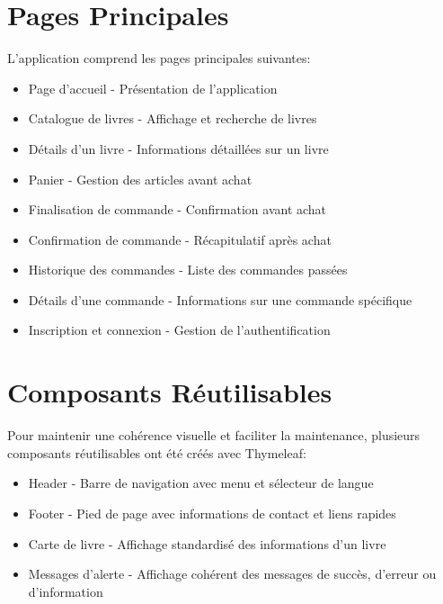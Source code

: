\documentclass[12pt,a4paper]{report}
\begin{document}
\section{Pages Principales}
L'application comprend les pages principales suivantes:

\begin{itemize}
    \item Page d'accueil - Présentation de l'application
    \item Catalogue de livres - Affichage et recherche de livres
    \item Détails d'un livre - Informations détaillées sur un livre
    \item Panier - Gestion des articles avant achat
    \item Finalisation de commande - Confirmation avant achat
    \item Confirmation de commande - Récapitulatif après achat
    \item Historique des commandes - Liste des commandes passées
    \item Détails d'une commande - Informations sur une commande spécifique
    \item Inscription et connexion - Gestion de l'authentification
\end{itemize}

\section{Composants Réutilisables}
Pour maintenir une cohérence visuelle et faciliter la maintenance, plusieurs composants réutilisables ont été créés avec Thymeleaf:

\begin{itemize}
    \item Header - Barre de navigation avec menu et sélecteur de langue
    \item Footer - Pied de page avec informations de contact et liens rapides
    \item Carte de livre - Affichage standardisé des informations d'un livre
    \item Messages d'alerte - Affichage cohérent des messages de succès, d'erreur ou d'information
\end{itemize}
\end{document}

